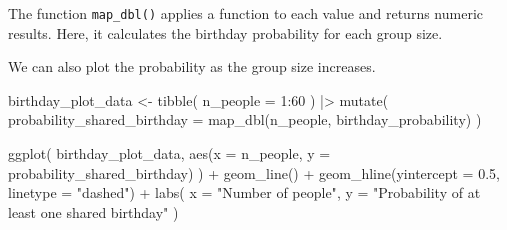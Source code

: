 \documentclass[
  letterpaper,
  DIV=11,
  numbers=noendperiod]{scrreprt}
\newenvironment{Shaded}{\begin{snugshade}}{\end{snugshade}}
\newcommand{\AttributeTok}[1]{\textcolor[rgb]{0.40,0.45,0.13}{#1}}
\newcommand{\DecValTok}[1]{\textcolor[rgb]{0.68,0.00,0.00}{#1}}
\newcommand{\FloatTok}[1]{\textcolor[rgb]{0.68,0.00,0.00}{#1}}
\newcommand{\FunctionTok}[1]{\textcolor[rgb]{0.28,0.35,0.67}{#1}}
\newcommand{\NormalTok}[1]{\textcolor[rgb]{0.00,0.23,0.31}{#1}}
\newcommand{\OtherTok}[1]{\textcolor[rgb]{0.00,0.23,0.31}{#1}}
\newcommand{\SpecialCharTok}[1]{\textcolor[rgb]{0.37,0.37,0.37}{#1}}
\newcommand{\StringTok}[1]{\textcolor[rgb]{0.13,0.47,0.30}{#1}}
\begin{document}
The function \texttt{map\_dbl()} applies a function to each value and
returns numeric results. Here, it calculates the birthday probability
for each group size.

\begin{table}

\caption{\label{tbl-birthday-problem}Probability of at least one shared
birthday for different group sizes}


\end{table}%

We can also plot the probability as the group size increases.

\begin{Shaded}
\begin{Highlighting}[]
\NormalTok{birthday\_plot\_data }\OtherTok{\textless{}{-}} \FunctionTok{tibble}\NormalTok{(}
  \AttributeTok{n\_people =} \DecValTok{1}\SpecialCharTok{:}\DecValTok{60}
\NormalTok{) }\SpecialCharTok{|\textgreater{}}
  \FunctionTok{mutate}\NormalTok{(}
    \AttributeTok{probability\_shared\_birthday =} \FunctionTok{map\_dbl}\NormalTok{(n\_people, birthday\_probability)}
\NormalTok{  )}

\FunctionTok{ggplot}\NormalTok{(}
\NormalTok{  birthday\_plot\_data,}
  \FunctionTok{aes}\NormalTok{(}\AttributeTok{x =}\NormalTok{ n\_people, }\AttributeTok{y =}\NormalTok{ probability\_shared\_birthday)}
\NormalTok{) }\SpecialCharTok{+}
  \FunctionTok{geom\_line}\NormalTok{() }\SpecialCharTok{+}
  \FunctionTok{geom\_hline}\NormalTok{(}\AttributeTok{yintercept =} \FloatTok{0.5}\NormalTok{, }\AttributeTok{linetype =} \StringTok{"dashed"}\NormalTok{) }\SpecialCharTok{+}
  \FunctionTok{labs}\NormalTok{(}
    \AttributeTok{x =} \StringTok{"Number of people"}\NormalTok{,}
    \AttributeTok{y =} \StringTok{"Probability of at least one shared birthday"}
\NormalTok{  )}
\end{Highlighting}
\end{Shaded}
\end{document}
